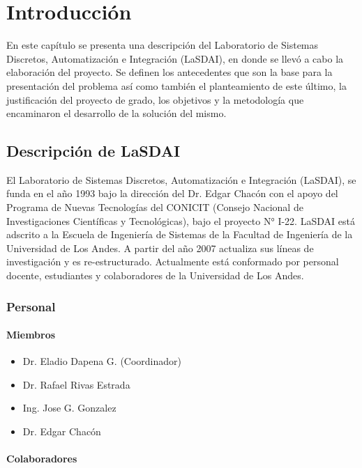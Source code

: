 \chapter{Introducción}

En este capítulo se presenta una descripción del Laboratorio de Sistemas Discretos, Automatización e Integración (LaSDAI), en donde se llevó a cabo la elaboración del proyecto. Se definen los antecedentes que son la base para la presentación del problema así como también el planteamiento de este último, la justificación del proyecto de grado, los objetivos y la metodología que encaminaron el desarrollo de la solución del mismo.

\section{Descripción de LaSDAI}

El Laboratorio de Sistemas Discretos, Automatización e Integración (LaSDAI), se funda en el año 1993 bajo la dirección del Dr. Edgar Chacón con el apoyo del Programa de Nuevas Tecnologías del CONICIT (Consejo Nacional de Investigaciones Científicas y Tecnológicas), bajo el proyecto N° I-22. LaSDAI está adscrito a la Escuela de Ingeniería de Sistemas de la Facultad de Ingeniería de la Universidad de Los Andes. A partir del año 2007 actualiza sus líneas de investigación y es re-estructurado. Actualmente está conformado por personal docente, estudiantes y colaboradores de la Universidad de Los Andes.\cite{lasdaiInicio}

\subsection{Personal}

\subsubsection{Miembros}

\begin{itemize}
	\itemsep1pt \parskip0pt 
	\item Dr. Eladio Dapena G. (Coordinador)
	\item Dr. Rafael Rivas Estrada
	\item Ing. Jose G. Gonzalez
	\item Dr. Edgar Chacón
\end{itemize}

\subsubsection{Colaboradores}

